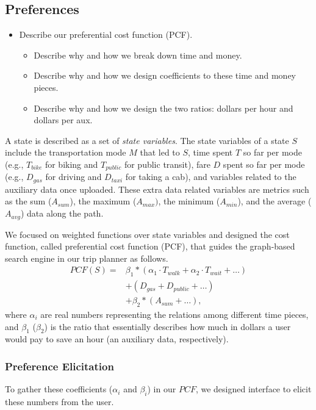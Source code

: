 \documentclass[letterpaper]{article}
\newcommand{\tit}[1]{\textit{#1}}
\newcommand{\PCF}{\mathit{PCF}}
\newcommand{\walk}{\mathit{walk}}
\newcommand{\bike}{\mathit{bike}}
\newcommand{\public}{\mathit{public}}
\newcommand{\taxi}{\mathit{taxi}}
\newcommand{\gas}{\mathit{gas}}
\newcommand{\wait}{\mathit{wait}}
\newcommand{\SUM}{\mathit{sum}}
\newcommand{\MAX}{\mathit{max}}
\newcommand{\MIN}{\mathit{min}}
\newcommand{\AVG}{\mathit{avg}}
\begin{document}
\subsection{Preferences}
\begin{itemize}
	\setlength\itemsep{1pt}
	\item Describe our preferential cost function (PCF).
	\begin{itemize}
		\setlength\itemsep{0pt}
		\item Describe why and how we break down time and money.
		\item Describe why and how we design coefficients to these time and money pieces.
		\item Describe why and how we design the two ratios: dollars per hour and dollars per aux.
	\end{itemize}
\end{itemize}

A state is described as a set of \tit{state variables}.
The state variables of a state $S$ include the transportation mode $M$ that led to $S$,
time spent $T$ so far per mode (e.g., $T_\bike$ for biking and $T_\public$ for
public transit), fare $D$ spent so far per mode (e.g., $D_\gas$ for driving and
$D_\taxi$ for taking a cab), and variables related to the auxiliary data once uploaded.
These extra data related variables are metrics such as the sum ($A_\SUM$),
the maximum ($A_\MAX)$, the minimum ($A_\MIN$), and the average ($A_\AVG$) data along the path.

We focused on weighted functions over state variables and
designed the cost function, called preferential cost function (PCF), that guides the
graph-based search engine in our trip planner as follows.
\begin{equation}
	\begin{aligned}
		\PCF(S) =& \beta_1 * (\alpha_1 \cdot T_\walk + \alpha_2 \cdot T_\wait + \ldots) \\
								&+ (D_\gas + D_\public + \ldots) \\
								&+ \beta_2 * (A_\SUM + \ldots),
	\end{aligned}
\end{equation}
where $\alpha_i$ are real numbers representing the relations among different time pieces,
and $\beta_1$ ($\beta_2$) is the ratio that essentially describes how much in dollars a user would pay to
save an hour (an auxiliary data, respectively).

\subsubsection{Preference Elicitation}
To gather these coefficients ($\alpha_i$ and $\beta_i$) in our $\PCF$, we designed interface to
elicit these numbers from the user.
\end{document}
